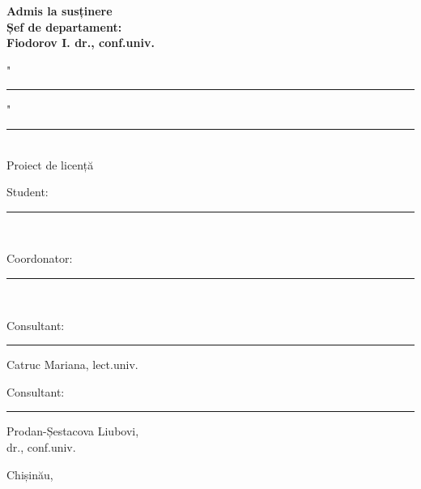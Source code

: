 \begin{titlepage}

    \newcommand{\HRule}{\rule{\linewidth}{0.5mm}}

    \UniversityHeader
    \center

    \vspace{2cm}
    \textbf{
        \hfill Admis la susținere\\
        \hfill Șef de departament:\\
        \hfill Fiodorov I. dr., conf.univ.\\
    }

    \vspace{0.4cm}
    \hfill "\rule{0.75cm}{0.2mm}" \ \rule{3cm}{0.2mm} \the\year
    \vspace{2cm}



    \begin{center}
        \Large \textbf{\ThesisTitle}\\
        \vspace{0.6cm}
        Proiect de licență
    \end{center}
    \vspace{1cm}


    \hfill Student: \rule{4.5cm}{0.2mm} \MyNameFull\\
    \vspace{0.2cm}

    \hfill Coordonator: \rule{4.4cm}{0.2mm} \CoordonatorFull\\
    \vspace{0.2cm}

    \hfill Consultant: \rule{4cm}{0.2mm} Catruc Mariana, lect.univ.\\
    \vspace{0.2cm}

    \hfill Consultant: \rule{4cm}{0.2mm} Prodan-Șestacova Liubovi,\\\hfill dr., conf.univ.\\
    \vspace{0.2cm}

    \vspace{5cm}

    \vfill
    \begin{center}
        Chișinău, \the\year
    \end{center}
\end{titlepage}
